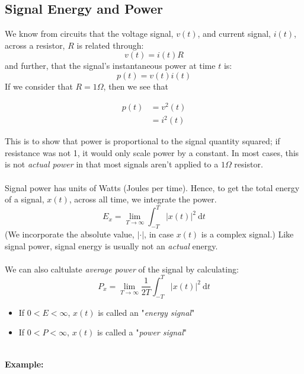 \documentclass[10pt]{article}
\newcommand{\example}{\textbf{Example: }}
\begin{document}
\subsection*{Signal Energy and Power}
We know from circuits that the voltage signal, $v(t)$, and current signal, $i(t)$, across a resistor, $R$ is related through:
\[v(t) = i(t)R\]
and further, that the signal's instantaneous power at time $t$ is:
\[p(t) = v(t)i(t)\]
If we consider that $R = 1 \Omega$, then we see that
\begin{center}
    \begin{align*}
        p(t) &= v^2(t) \\
        &= i^2(t)
    \end{align*}
\end{center}
This is to show that power is proportional to the signal quantity squared; if resistance was not 1, it would only scale power by a constant.  In most cases, this is not \textit{actual power} in that most signals aren't applied to a $1 \Omega$ resistor.\\\\
Signal power has units of Watts (Joules per time).  Hence, to get the total energy of a signal, $x(t)$, across all time, we integrate the power.
\[\boxed{E_x = \lim_{T \rightarrow \infty} \int_{-T}^T \vert x(t) \vert^2 \:\text{d}t}\]
(We incorporate the absolute value, $\vert \cdot \vert$, in case $x(t)$ is a complex signal.)  Like signal power, signal energy is usually not an \textit{actual} energy.\\\\
We can also caltulate \textit{average power} of the signal by calculating:
\[\boxed{P_x = \lim_{T \rightarrow \infty} \frac{1}{2T} \int_{-T}^T \vert x(t) \vert^2 \:\text{d}t}\]
\begin{itemize}
    \item If $0 < E < \infty$, $x(t)$ is called an "\textit{energy signal}"
    \item If $0 < P < \infty$, $x(t)$ is called a "\textit{power signal}"
\end{itemize}
~\\
\example
\end{document}
